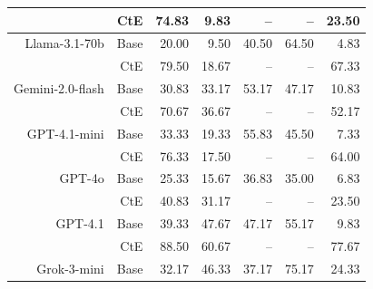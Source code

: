 \begin{table}[!t]
\begin{tabular}{r r !{\color{white!80!black} \vline} r r r r r}
& CtE & \textcolor{blue!60!black}{74.83} & \textcolor{blue!60!black}{9.83} & \textcolor{blue!60!black}{--} & \textcolor{blue!60!black}{--} & \textcolor{blue!60!black}{23.50} \\ \midrule
\sf Llama-3.1-70b  & Base & \textcolor{blue!60!black}{20.00} & \textcolor{blue!60!black}{9.50} & \textcolor{blue!60!black}{40.50} & \textcolor{blue!60!black}{64.50} & \textcolor{blue!60!black}{4.83} \\
& CtE & \textcolor{blue!60!black}{79.50} & \textcolor{blue!60!black}{18.67} & \textcolor{blue!60!black}{--} & \textcolor{blue!60!black}{--} & \textcolor{blue!60!black}{67.33} \\ \midrule
\sf Gemini-2.0-flash  & Base & \textcolor{blue!60!black}{30.83} & \textcolor{blue!60!black}{33.17} & \textcolor{blue!60!black}{53.17} & \textcolor{blue!60!black}{47.17} & \textcolor{blue!60!black}{10.83} \\
& CtE & \textcolor{blue!60!black}{70.67} & \textcolor{blue!60!black}{36.67} & \textcolor{blue!60!black}{--} & \textcolor{blue!60!black}{--} & \textcolor{blue!60!black}{52.17} \\ \midrule
\sf GPT-4.1-mini  & Base & \textcolor{blue!60!black}{33.33} & \textcolor{blue!60!black}{19.33} & \textcolor{blue!60!black}{55.83} & \textcolor{blue!60!black}{45.50} & \textcolor{blue!60!black}{7.33} \\
& CtE & \textcolor{blue!60!black}{76.33} & \textcolor{blue!60!black}{17.50} & \textcolor{blue!60!black}{--} & \textcolor{blue!60!black}{--} & \textcolor{blue!60!black}{64.00} \\ \midrule
\sf GPT-4o  & Base & \textcolor{blue!60!black}{25.33} & \textcolor{blue!60!black}{15.67} & \textcolor{blue!60!black}{36.83} & \textcolor{blue!60!black}{35.00} & \textcolor{blue!60!black}{6.83} \\
& CtE & \textcolor{blue!60!black}{40.83} & \textcolor{blue!60!black}{31.17} & \textcolor{blue!60!black}{--} & \textcolor{blue!60!black}{--} & \textcolor{blue!60!black}{23.50} \\ \midrule
\sf GPT-4.1  & Base & \textcolor{blue!60!black}{39.33} & \textcolor{blue!60!black}{47.67} & \textcolor{blue!60!black}{47.17} & \textcolor{blue!60!black}{55.17} & \textcolor{blue!60!black}{9.83} \\
& CtE & \textcolor{blue!60!black}{88.50} & \textcolor{blue!60!black}{60.67} & \textcolor{blue!60!black}{--} & \textcolor{blue!60!black}{--} & \textcolor{blue!60!black}{77.67} \\ \midrule
\sf Grok-3-mini  & Base & \textcolor{blue!60!black}{32.17} & \textcolor{blue!60!black}{46.33} & \textcolor{blue!60!black}{37.17} & \textcolor{blue!60!black}{75.17} & \textcolor{blue!60!black}{24.33} \\

\end{tabular}
\end{table}
